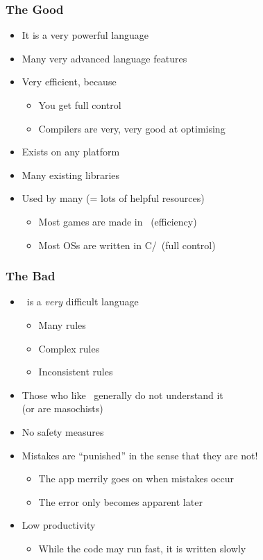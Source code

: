 \documentclass{../ucll-slides}
\begin{document}
\begin{frame}
  \frametitle{The Good}
  \begin{itemize}
    \item It is a very powerful language
    \item Many very advanced language features
    \item Very efficient, because
          \begin{itemize}
            \item You get full control
            \item Compilers are very, very good at optimising
          \end{itemize}
    \item Exists on any platform
    \item Many existing libraries
    \item Used by many (= lots of helpful resources)
          \begin{itemize}
            \item Most games are made in \cpp\ (efficiency)
            \item Most OSs are written in C/\cpp\ (full control)
          \end{itemize}
  \end{itemize}
\end{frame}

\begin{frame}
  \frametitle{The Bad}
  \begin{itemize}
    \item \cpp\ is a \emph{very} difficult language
          \begin{itemize}
            \item Many rules
            \item Complex rules
            \item Inconsistent rules
          \end{itemize}
    \item Those who like \cpp\ generally do not understand it \\
          (or are masochists)
    \item No safety measures
    \item Mistakes are ``punished'' in the sense that they are not!
          \begin{itemize}
            \item The app merrily goes on when mistakes occur
            \item The error only becomes apparent later
          \end{itemize}
    \item Low productivity
          \begin{itemize}
            \item While the code may run fast, it is written slowly
          \end{itemize}
  \end{itemize}
\end{frame}
\end{document}
